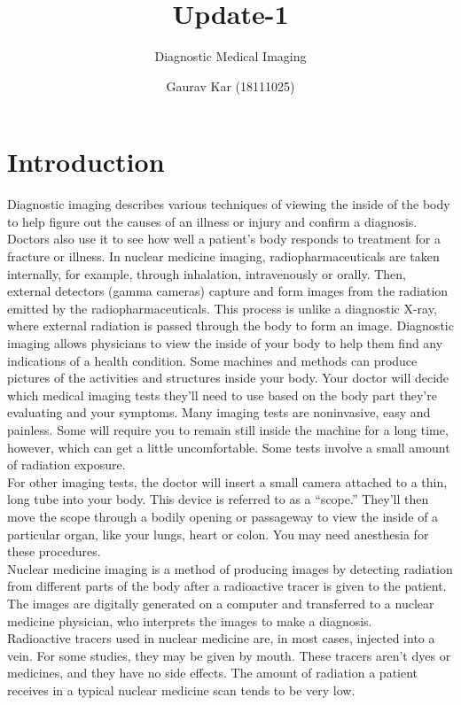 \documentclass{article}
\title{Update-1}
\author{Diagnostic Medical Imaging}
\date{Gaurav Kar (18111025)}
\begin{document}
\maketitle

\section{Introduction}
Diagnostic imaging describes various techniques of viewing the inside of the body to help figure out the causes of an illness or injury and confirm a diagnosis. Doctors also use it to see how well a patient’s body responds to treatment for a fracture or illness. In nuclear medicine imaging, radiopharmaceuticals are taken internally, for example, through inhalation, intravenously or orally. Then, external detectors (gamma cameras) capture and form images from the radiation emitted by the radiopharmaceuticals. This process is unlike a diagnostic X-ray, where external radiation is passed through the body to form an image. Diagnostic imaging allows physicians to view the inside of your body to help them find any indications of a health condition. Some machines and methods can produce pictures of the activities and structures inside your body. Your doctor will decide which medical imaging tests they’ll need to use based on the body part they’re evaluating and your symptoms. Many imaging tests are noninvasive, easy and painless. Some will require you to remain still inside the machine for a long time, however, which can get a little uncomfortable. Some tests involve a small amount of radiation exposure.\\
For other imaging tests, the doctor will insert a small camera attached to a thin, long tube into your body. This device is referred to as a “scope.” They’ll then move the scope through a bodily opening or passageway to view the inside of a particular organ, like your lungs, heart or colon. You may need anesthesia for these procedures.\\Nuclear medicine imaging is a method of producing images by detecting radiation from different parts of the body after a radioactive tracer is given to the patient. The images are digitally generated on a computer and transferred to a nuclear medicine physician, who interprets the images to make a diagnosis.\\Radioactive tracers used in nuclear medicine are, in most cases, injected into a vein. For some studies, they may be given by mouth. These tracers aren’t dyes or medicines, and they have no side effects. The amount of radiation a patient receives in a typical nuclear medicine scan tends to be very low.
\end{document}

